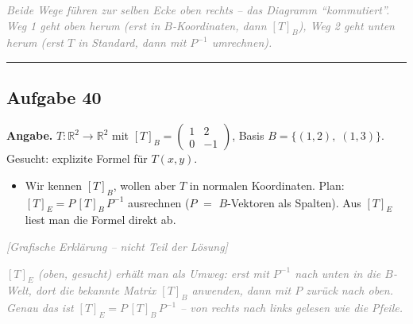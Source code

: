 \documentclass[a4paper,12pt]{article}
\newcommand{\grafik}{\textcolor{gray}{\small\textit{[Grafische Erkl\"arung -- nicht Teil der L\"osung]}}}
\begin{document}
\textcolor{gray}{\small\textit{Beide Wege f\"uhren zur selben Ecke oben rechts -- das Diagramm ``kommutiert''. Weg 1 geht oben herum (erst in $B$-Koordinaten, dann $[T]_B$), Weg 2 geht unten herum (erst $T$ in Standard, dann mit $P^{-1}$ umrechnen).}}

\bigskip
\hrule
\bigskip

\subsection*{Aufgabe 40}

\textbf{Angabe.} $T \colon \mathbb{R}^2 \to \mathbb{R}^2$ mit $[T]_B = \begin{pmatrix} 1 & 2 \\ 0 & -1 \end{pmatrix}$, Basis $B = \{(1,2),\; (1,3)\}$. Gesucht: explizite Formel f\"ur $T(x, y)$.

\begin{wastun}
\begin{itemize}[leftmargin=*, nosep]
    \item Wir kennen $[T]_B$, wollen aber $T$ in normalen Koordinaten. Plan: $[T]_E = P\,[T]_B\,P^{-1}$ ausrechnen ($P$ $=$ $B$-Vektoren als Spalten). Aus $[T]_E$ liest man die Formel direkt ab.
\end{itemize}
\end{wastun}

\grafik

\begin{center}
\end{center}

\textcolor{gray}{\small\textit{$[T]_E$ (oben, gesucht) erh\"alt man als Umweg: erst mit $P^{-1}$ nach unten in die $B$-Welt, dort die bekannte Matrix $[T]_B$ anwenden, dann mit $P$ zur\"uck nach oben. Genau das ist $[T]_E = P\,[T]_B\,P^{-1}$ -- von rechts nach links gelesen wie die Pfeile.}}
\end{document}
